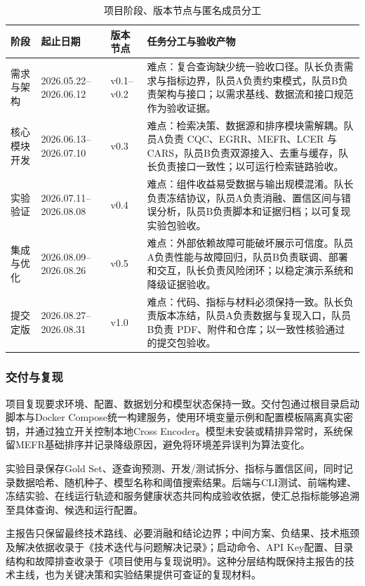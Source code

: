 \documentclass[a4paper,12pt,fontset=none]{ctexart}
\begin{document}
\begin{table}[H]
\centering
\small
\caption{项目阶段、版本节点与匿名成员分工}
\begin{tabularx}{\textwidth}{C{2.2cm} C{2.7cm} C{1.5cm} Y}
\toprule
\textbf{阶段} & \textbf{起止日期} & \textbf{版本节点} & \textbf{任务分工与验收产物} \\
\midrule
需求与架构 & 2026.05.22--2026.06.12 & v0.1--v0.2 & 难点：复合查询缺少统一验收口径。队长负责需求与指标边界，队员A负责约束模式，队员B负责架构与接口；以需求基线、数据流和接口规范作为验收证据。 \\
核心模块开发 & 2026.06.13--2026.07.10 & v0.3 & 难点：检索决策、数据源和排序模块需解耦。队员A负责 CQC、EGRR、MEFR、LCER 与 CARS，队员B负责双源接入、去重与缓存，队长负责接口一致性；以可运行检索链路验收。 \\
实验验证 & 2026.07.11--2026.08.08 & v0.4 & 难点：组件收益易受数据与输出规模混淆。队长负责冻结协议，队员A负责消融、置信区间与错误分析，队员B负责脚本和证据归档；以可复现实验包验收。 \\
集成与优化 & 2026.08.09--2026.08.26 & v0.5 & 难点：外部依赖故障可能破坏展示可信度。队员A负责性能与故障回归，队员B负责联调、部署和交互，队长负责风险闭环；以稳定演示系统和降级证据验收。 \\
提交定版 & 2026.08.27--2026.08.31 & v1.0 & 难点：代码、指标与材料必须保持一致。队长负责版本冻结，队员A负责数据与复现入口，队员B负责 PDF、附件和仓库；以一致性核验通过的提交包验收。 \\
\bottomrule
\end{tabularx}
\end{table}

\subsubsection{交付与复现}

项目复现要求环境、配置、数据划分和模型状态保持一致。交付包通过根目录启动脚本与Docker Compose统一构建服务，使用环境变量示例和配置模板隔离真实密钥，并通过独立开关控制本地Cross Encoder。模型未安装或精排异常时，系统保留MEFR基础排序并记录降级原因，避免将环境差异误判为算法变化。

实验目录保存Gold Set、逐查询预测、开发/测试拆分、指标与置信区间，同时记录数据哈希、随机种子、模型名称和阈值搜索结果。后端与CLI测试、前端构建、冻结实验、在线运行轨迹和服务健康状态共同构成验收依据，使汇总指标能够追溯至具体查询、候选和运行配置。

主报告只保留最终技术路线、必要消融和结论边界；中间方案、负结果、技术瓶颈及解决依据收录于《技术迭代与问题解决记录》；启动命令、API Key配置、目录结构和故障排查收录于《项目使用与复现说明》。这种分层结构既保持主报告的技术主线，也为关键决策和实验结果提供可查证的复现材料。
\end{document}
